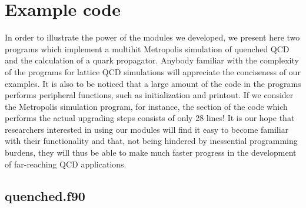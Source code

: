 \section{Example code}
\label{excode}
In order to illustrate the power of the modules we developed, we
present here two programs which implement a multihit Metropolis
simulation of quenched QCD and the calculation of a quark propagator.
Anybody familiar with the complexity of the programs for
lattice QCD simulations will appreciate the conciseness of our
examples.  It is also to be noticed that a large amount of the
code in the programs performs peripheral functions, such as
initialization and printout.  If we consider the Metropolis
simulation program, for instance, the section of the code which
performs the actual upgrading steps consists of only 28 lines!
It is our hope that researchers interested in using our modules
will find it easy to become familiar with their functionality
and that, not being hindered by inessential programming burdens,
they will thus be able to make much faster progress in the development
of far-reaching QCD applications.


\subsection{quenched.f90}

